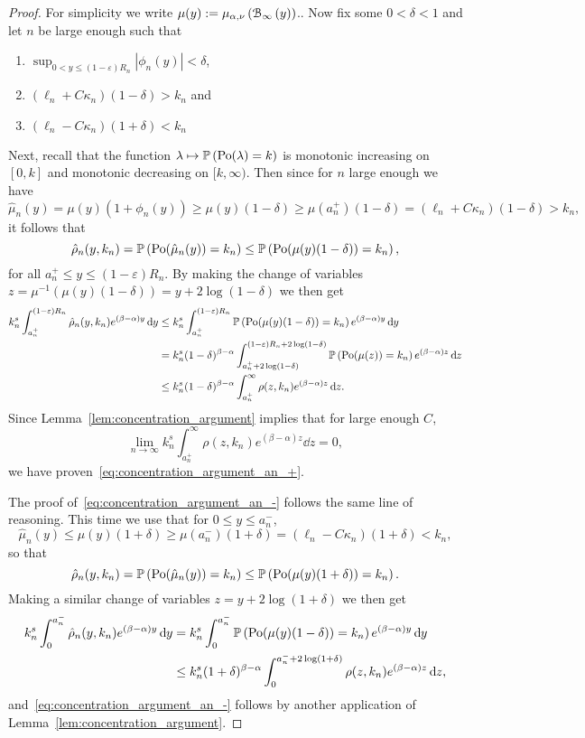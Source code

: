 \begin{proof}
For simplicity we write $\mu(y) := \mu_{\alpha,\nu}\left({\mathcal B}_{\infty}\left(y\right)\right)$.. Now fix some $0 < \delta < 1$ and let $n$ be large enough such that 
\begin{enumerate}
\item $\sup_{0 < y \le (1-\varepsilon)R_n} |\phi_n(y)| < \delta$,
\item $(\ell_n + C \kappa_n)(1 - \delta) > k_n$ and
\item $(\ell_n - C \kappa_n)(1 + \delta) < k_n$
\end{enumerate}

Next, recall that the function $\lambda \mapsto \mathbb{P}\left({\mathrm{Po}}(\lambda) = k\right)$ is monotonic increasing on $[0,k]$ and monotonic decreasing on $[k, \infty)$. Then since for $n$ large enough we have 
\[
	\hat{\mu}_n(y) = \mu(y)(1 + \phi_n(y)) \ge \mu(y)(1 - \delta) \ge \mu(a_n^+)(1 - \delta)
	= (\ell_n + C \kappa_n)(1 - \delta) > k_n,
\]
it follows that 
\[
	\hat{\rho}_n(y,k_n) = \mathbb{P}\left({\mathrm{Po}}(\hat{\mu}_n(y)) = k_n\right) \le \mathbb{P}\left({\mathrm{Po}}(\mu(y)(1-\delta)) = k_n\right),
\]
for all $a_n^+ \le y \le (1-\varepsilon)R_n$. By making the change of variables $z = \mu^{-1}(\mu(y)(1-\delta)) = y + 2 \log(1-\delta)$ we then get
\begin{align*}
	k_n^s \int_{a_n^+}^{(1-\varepsilon)R_n} \hat{\rho}_n(y,k_n) e^{(\beta - \alpha)y} \operatorname{\mathrm{d}\hspace{-2pt}} y
	&\le k_n^s \int_{a_n^+}^{(1-\varepsilon)R_n} \mathbb{P}\left({\mathrm{Po}}(\mu(y)(1-\delta)) = k_n\right) 
		e^{(\beta-\alpha) y} \operatorname{\mathrm{d}\hspace{-2pt}} y\\
	&= k_n^s (1-\delta)^{\beta - \alpha} \int_{a_n^+ + 2\log(1-\delta)}^{(1-\varepsilon)R_n + 2\log(1-\delta)} 
		\mathbb{P}\left({\mathrm{Po}}(\mu(z)) = k_n\right) e^{(\beta - \alpha)z} \operatorname{\mathrm{d}\hspace{-2pt}} z\\
	&\le k_n^s (1-\delta)^{\beta - \alpha} \int_{a_n^+}^{\infty} \rho(z,k_n) e^{(\beta - \alpha)z} \operatorname{\mathrm{d}\hspace{-2pt}} z.
\end{align*}
Since Lemma~\ref{lem:concentration_argument} implies that for large enough $C$,
\[
	\lim_{n \to \infty} k_n^s \int_{a_n^+}^{\infty} \rho(z,k_n) e^{(\beta - \alpha)z} \dd z = 0,
\]
we have proven~\eqref{eq:concentration_argument_an_+}.

The proof of~\eqref{eq:concentration_argument_an_-} follows the same line of reasoning. This time we use that for $0 \le y \le a_n^-$,
\[
	\hat{\mu}_n(y) \le \mu(y)(1 + \delta) \ge \mu(a_n^-)(1 + \delta)
		= (\ell_n - C \kappa_n)(1 + \delta) < k_n,
\]
so that 
\[
	\hat{\rho}_n(y,k_n) = \mathbb{P}\left({\mathrm{Po}}(\hat{\mu}_n(y)) = k_n\right) \le \mathbb{P}\left({\mathrm{Po}}(\mu(y)(1+\delta)) = k_n\right).
\]
Making a similar change of variables $z = y + 2 \log(1+\delta)$ we then get
\begin{align*}
	k_n^s \int_0^{a_n^-} \hat{\rho}_n(y,k_n) e^{(\beta - \alpha)y} \operatorname{\mathrm{d}\hspace{-2pt}} y
	&= k_n^s \int_0^{a_n^-}\mathbb{P}\left({\mathrm{Po}}(\mu(y)(1-\delta)) = k_n\right) 
		e^{(\beta-\alpha) y} \operatorname{\mathrm{d}\hspace{-2pt}} y\\
	&\le k_n^s (1+\delta)^{\beta - \alpha} \int_0^{a_n^- + 2\log(1+\delta)} 
		\rho(z,k_n) e^{(\beta - \alpha)z} \operatorname{\mathrm{d}\hspace{-2pt}} z,
\end{align*}
and~\eqref{eq:concentration_argument_an_-} follows by another application of Lemma~\ref{lem:concentration_argument}. 


\end{proof}
